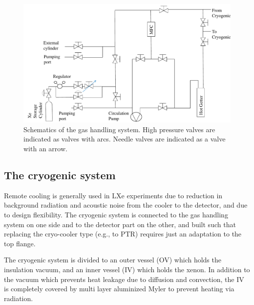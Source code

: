 \begin{figure}[h]
\centerline{\includegraphics[width=0.75\linewidth]{GasSchematics.png}}
\caption{Schematics of the gas handling system. High pressure valves are indicated as 
valves with arcs. Needle valves are indicated as 
a valve with an arrow.}
\label{fig:gasSchematic}
\end{figure}


\subsection{The cryogenic system}
\label{subsec:cryo}

Remote cooling is generally used in LXe experiments due to reduction in background radiation and acoustic noise from the cooler to the detector, and due to design flexibility. The cryogenic system is connected to the gas handling system on 
one side and to the detector part on the other, and built such that replacing the cryo-cooler type (e.g., to PTR) requires just an adaptation to the top flange.


The cryogenic system is divided to an outer vessel (OV) which holds 
the insulation vacuum, and an inner vessel (IV) which holds the xenon. In addition to the vacuum which prevents heat leakage due to diffusion and convection, the IV is completely covered by multi layer aluminized Myler to prevent heating via radiation.  

